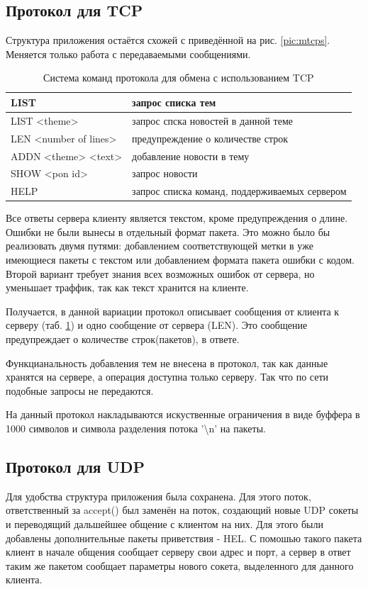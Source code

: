 \documentclass[a4paper]{article}
\begin{document}
\subsection{Протокол для TCP}
Структура приложения остаётся схожей с приведённой на рис. \ref{pic:mtcps}. Меняется только работа с передаваемыми сообщениями.
\begin{table}[H]
\begin{center}
\caption{Система команд протокола для обмена с использованием TCP}
\label{tabular:TCPstruct}
\begin{tabular}{|l|l|}
\hline
LIST & запрос списка тем\\ \hline
LIST <theme> & запрос спска новостей в данной теме\\ \hline
LEN <number of lines> & предупреждение о количестве строк\\ \hline
ADDN <theme> <text> & добавление новости в тему\\ \hline
SHOW <pon id> & запрос новости\\ \hline
HELP & запрос списка команд, поддерживаемых сервером\\ \hline
\end{tabular}
\end{center}
\end{table}

Все ответы сервера клиенту является текстом, кроме предупреждения о длине. Ошибки не были вынесы в отдельный формат пакета. Это можно было бы реализовать двумя путями: добавлением соответствующей метки в уже имеющиеся пакеты с текстом или добавлением формата пакета ошибки с кодом. Второй вариант требует знания всех возможных ошибок от сервера, но уменьшает траффик, так как текст хранится на клиенте.

Получается, в данной вариации протокол описывает сообщения от клиента к серверу (таб. \ref{tabular:TCPstruct}) и одно сообщение от сервера (LEN). Это сообщение предупреждает о количестве строк(пакетов), в ответе.

Функцианальность добавления тем не внесена в протокол, так как данные хранятся на сервере, а операция доступна только серверу. Так что по сети подобные запросы не передаются.

На данный протокол накладываются искуственные ограничения в виде буффера в 1000 символов и символа разделения потока '\textbackslash n' на пакеты.
\subsection{Протокол для UDP}
Для удобства структура приложения была сохранена. Для этого поток, ответственный за accept() был заменён на поток, создающий новые UDP сокеты и переводящий дальшейшее общение с клиентом на них. Для этого были добавлены дополнительные пакеты приветствия - HEL. С помошью такого пакета клиент в начале общения сообщает серверу свои адрес и порт, а сервер в ответ таким же пакетом сообщает параметры нового сокета, выделенного для данного клиента.
\end{document}
